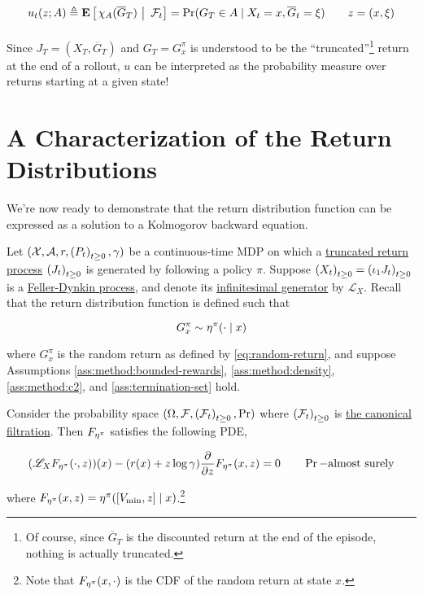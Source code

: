 \begin{equation}
  \label{eq:phi-chi}
  u_t(z; A) \triangleq \Expectation{}{\Conditional{\chi_A(\overline{G}_T)}{\mathcal{F}_t}}
  = \Pr(G_T\in A\mid X_t=x, \overline{G}_t = \xi)\qquad z = (x, \xi)\\
\end{equation}

Since $J_T=(X_T, \overline{G}_T)$ and $G_T=G_x^\pi$ is understood to
be the ``truncated''\footnote{Of course, since $\overline{G}_T$ is the
  discounted return at the end of the episode, nothing is actually
  truncated.} return at the end of a  rollout, $u$ can be
interpreted as the probability measure over returns starting at a given state!

\section{A Characterization of the Return Distributions}\label{s:characterization}
We're now ready to demonstrate that the return distribution function
can be expressed as a solution to a Kolmogorov backward equation.

\begin{theorem}
  \label{thm:dhjb}
  Let $(\mathcal{X}, \mathcal{A}, r, \indexedabove{t}{P}, \gamma)$ be
  a continuous-time MDP on which a
  \hyperref[def:truncated-return]{truncated return process}
  $\indexedabove{t}{J}$ is generated by following a policy
  $\pi$. Suppose $\indexedabove{t}{X} = \indexedabove{t}{\proj{1}J}$
  is a \hyperref[def:feller-dynkin]{Feller-Dynkin process}, and denote
  its \hyperref[def:generator]{infinitesimal generator} by
  $\mathscr{L}_X$. Recall that the return distribution function is defined such
  that

  \begin{equation*}
    G_x^\pi\sim\returnmeasure^\pi(\cdot\mid x)
  \end{equation*}

  where $G_x^\pi$ is the random return as defined by
  \eqref{eq:random-return}, and suppose Assumptions
  \ref{ass:method:bounded-rewards}, \ref{ass:method:density},
  \ref{ass:method:c2}, and \ref{ass:termination-set} hold.

  Consider the probability space $(\Omega, \mathcal{F},
  \indexedabove{t}{\mathcal{F}}, \Pr)$ where
  $\indexedabove{t}{\mathcal{F}}$ is
  \hyperref[def:canonical-filtration]{the canonical filtration}. Then
  $\cdf$ satisfies 
  the following PDE,

  \begin{equation}
    \label{eq:dhjb}
    (\mathscr{L}_X\cdf(\cdot, z))(x) -
    (r(x) + z\log\gamma)\partialderiv{}{z}\cdf(x, z)
    = 0\qquad\Pr-\text{almost surely}
  \end{equation}

  where $\cdf(x, z) = \returnmeasure^\pi([V_{\min}, z]\mid
  x)$.\footnote{Note that $\cdf(x, \cdot)$ is the CDF of the random return at
    state $x$.}
\end{theorem}

